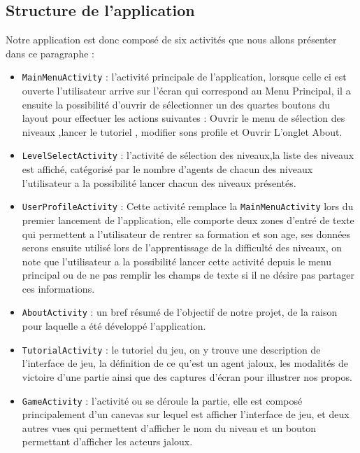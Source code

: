 \documentclass[a4paper, 10pt]{article}
\begin{document}
	\subsection{Structure de l'application}
Notre application est donc composé de six activités que nous allons présenter dans ce paragraphe :
\hfill \break
\begin{itemize}
 \item \texttt{MainMenuActivity} : l'activité principale de l'application, lorsque celle ci est ouverte l'utilisateur arrive sur l'écran qui correspond au Menu Principal, il a ensuite la possibilité d'ouvrir de sélectionner un des quartes boutons du layout pour effectuer les actions suivantes : Ouvrir le menu de sélection des niveaux ,lancer le tutoriel , modifier sons profile et Ouvrir L'onglet About.
 \item \texttt{LevelSelectActivity} : l'activité de sélection des niveaux,la liste des niveaux est affiché, catégorisé par le nombre d'agents de chacun des niveaux l'utilisateur a la possibilité lancer chacun des niveaux présentés.
 \item \texttt{UserProfileActivity} : Cette activité remplace la \texttt{MainMenuActivity} lors du premier lancement de l'application, elle comporte deux zones d'entré de texte qui permettent a l'utilisateur de rentrer sa formation et son age, ses données serons ensuite utilisé lors de l'apprentissage de la difficulté des niveaux, on note que l'utilisateur a la possibilité lancer cette activité depuis le menu principal ou de ne pas remplir les champs de texte si il ne désire pas partager ces informations. 
 \item\texttt{AboutActivity} : un bref résumé de l'objectif de notre projet, de la raison pour laquelle a été développé l'application.
 \item\texttt{TutorialActivity} : le tutoriel du jeu, on y trouve une description de l'interface de jeu, la définition de ce qu'est un agent jaloux, les modalités de victoire d'une partie ainsi que des captures d'écran pour illustrer nos propos.
 \item \texttt{GameActivity} : l'activité ou se déroule la partie, elle est composé principalement d'un canevas sur lequel est afficher l'interface de jeu, et deux autres vues qui permettent d'afficher le nom du niveau et un bouton permettant d'afficher les acteurs jaloux.
 \end{itemize}  
 
\end{document}
